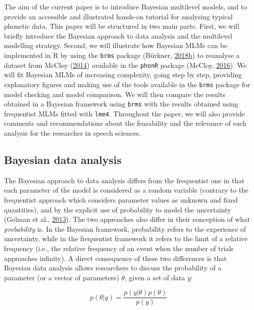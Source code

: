 \documentclass[a4paper,12pt,twoside,onecolumn,openright,final,oldfontcommands]{memoir}
\begin{document}
The aim of the current paper is to introduce Bayesian multilevel models, and to provide an accessible and illustrated hands-on tutorial for analysing typical phonetic data. This paper will be structured in two main parts. First, we will briefly introduce the Bayesian approach to data analysis and the multilevel modelling strategy. Second, we will illustrate how Bayesian MLMs can be implemented in R by using the \texttt{brms} package (Bürkner, \protect\hyperlink{ref-R-brms}{2018}\protect\hyperlink{ref-R-brms}{b}) to reanalyse a dataset from McCloy (\protect\hyperlink{ref-mccloy_phonetic_2014}{2014}) available in the \texttt{phonR} package (McCloy, \protect\hyperlink{ref-R-phonR}{2016}). We will fit Bayesian MLMs of increasing complexity, going step by step, providing explanatory figures and making use of the tools available in the \texttt{brms} package for model checking and model comparison. We will then compare the results obtained in a Bayesian framework using \texttt{brms} with the results obtained using frequentist MLMs fitted with \texttt{lme4}. Throughout the paper, we will also provide comments and recommendations about the feasability and the relevance of such analysis for the researcher in speech sciences.

\hypertarget{bayesian-data-analysis}{%
\subsection{Bayesian data analysis}\label{bayesian-data-analysis}}

The Bayesian approach to data analysis differs from the frequentist one in that each parameter of the model is considered as a random variable (contrary to the frequentist approach which considers parameter values as unknown and fixed quantities), and by the explicit use of probability to model the uncertainty (Gelman et al., \protect\hyperlink{ref-gelman_bayesian_2013}{2013}). The two approaches also differ in their conception of what \emph{probability} is. In the Bayesian framework, probability refers to the experience of uncertainty, while in the frequentist framework it refers to the limit of a relative frequency (i.e., the relative frequency of an event when the number of trials approaches infinity). A direct consequence of these two differences is that Bayesian data analysis allows researchers to discuss the probability of a parameter (or a vector of parameters) \(\theta\), given a set of data \(y\):

\[p(\theta|y) = \frac{p(y|\theta)p(\theta)}{p(y)}\]
\end{document}
